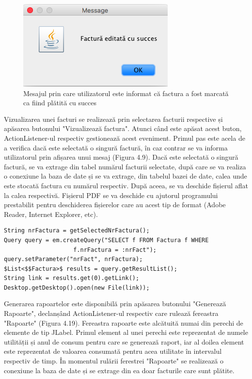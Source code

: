 \documentclass[12pt]{book}
\begin{document}
\begin{figure}[!ht]
	\centering
	\includegraphics{EditareSucces}
	\caption{Mesajul prin care utilizatorul este informat că factura a fost marcată ca fiind plătită cu succes}
\end{figure}

Vizualizarea unei facturi se realizează prin selectarea facturii respective și apăsarea butonului "Vizualizează factura". Atunci când este apăsat acest buton, ActionListener-ul respectiv gestionează acest eveniment. Primul pas este acela de a verifica dacă este selectată o singură factură, în caz contrar se va informa utilizatorul prin afișarea unui mesaj (Figura 4.9). Dacă este selectată o singură factură, se va extrage din tabel numărul facturii selectate, după care se va realiza o conexiune la baza de date și se va extrage, din tabelul bazei de date, calea unde este stocată factura cu numărul respectiv. După aceea, se va deschide fișierul aflat la calea respectivă. Fișierul PDF se va deschide cu ajutorul programului prestabilit pentru deschiderea fișierelor care au acest tip de format (Adobe Reader, Internet Explorer, etc). 

\begin{lstlisting}[frame=single, caption=Extragerea și deschiderea fișierului PDF aferent facturii respective]
String nrFactura = getSelectedNrFactura();
Query query = em.createQuery("SELECT f FROM Factura f WHERE 
					f.nrFactura = :nrFact");
query.setParameter("nrFact", nrFactura);
$List<$$Factura>$ results = query.getResultList();
String link = results.get(0).getLink();
Desktop.getDesktop().open(new File(link));
\end{lstlisting}

Generarea rapoartelor este disponibilă prin apăsarea butonului "Generează Rapoarte", declanșând ActionListener-ul respectiv care rulează fereastra "Rapoarte" (Figura 4.19). Fereastra rapoarte este alcătuită numai din perechi de elemente de tip JLabel. Primul element al unei perechi este reprezentat de numele utilității și anul de consum pentru care se generează raport, iar al doilea element este reprezentat de valoarea consumată pentru acea utilitate în intervalul respectiv de timp. În momentul rulării ferestrei "Rapoarte" se realizează o conexiune la baza de date și se extrage din ea doar facturile care sunt plătite.
\end{document}
